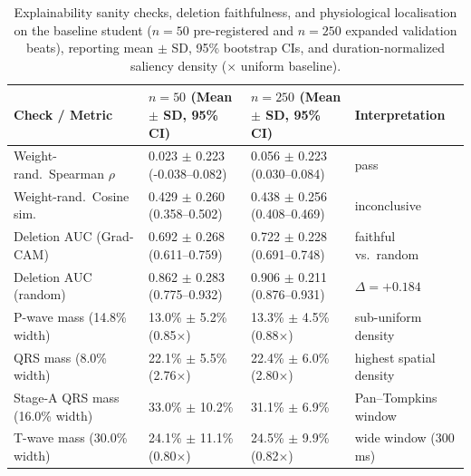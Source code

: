 \begin{table}[t]
\centering
\caption{Explainability sanity checks, deletion faithfulness, and physiological localisation on the baseline student ($n=50$ pre-registered and $n=250$ expanded validation beats), reporting mean $\pm$ SD, 95\% bootstrap CIs, and duration-normalized saliency density ($\times$ uniform baseline).}
\label{tab:explainability_revised}
\begin{tabular}{llll}
\toprule
Check / Metric & $n=50$ (Mean $\pm$ SD, 95\% CI) & $n=250$ (Mean $\pm$ SD, 95\% CI) & Interpretation \\
\midrule
Weight-rand.\ Spearman $\rho$ & 0.023 $\pm$ 0.223 (-0.038--0.082) & 0.056 $\pm$ 0.223 (0.030--0.084) & pass \\
Weight-rand.\ Cosine sim. & 0.429 $\pm$ 0.260 (0.358--0.502) & 0.438 $\pm$ 0.256 (0.408--0.469) & inconclusive \\
Deletion AUC (Grad-CAM) & 0.692 $\pm$ 0.268 (0.611--0.759) & 0.722 $\pm$ 0.228 (0.691--0.748) & faithful vs.\ random \\
Deletion AUC (random) & 0.862 $\pm$ 0.283 (0.775--0.932) & 0.906 $\pm$ 0.211 (0.876--0.931) & $\Delta=+0.184$ \\
P-wave mass (14.8\% width) & 13.0\% $\pm$ 5.2\% (0.85$\times$) & 13.3\% $\pm$ 4.5\% (0.88$\times$) & sub-uniform density \\
QRS mass (8.0\% width) & 22.1\% $\pm$ 5.5\% (2.76$\times$) & 22.4\% $\pm$ 6.0\% (2.80$\times$) & highest spatial density \\
Stage-A QRS mass (16.0\% width) & 33.0\% $\pm$ 10.2\% & 31.1\% $\pm$ 6.9\% & Pan--Tompkins window \\
T-wave mass (30.0\% width) & 24.1\% $\pm$ 11.1\% (0.80$\times$) & 24.5\% $\pm$ 9.9\% (0.82$\times$) & wide window (300 ms) \\
\bottomrule
\end{tabular}
\end{table}